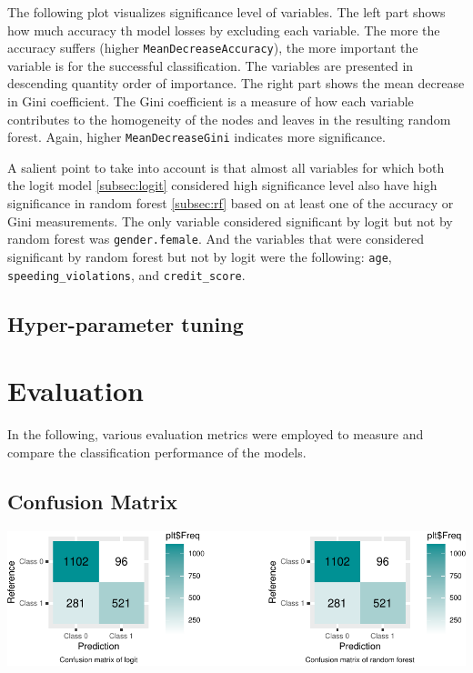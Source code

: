\documentclass{article}
\begin{document}
The following plot visualizes significance level of variables. The left
part shows how much accuracy th model losses by excluding each variable.
The more the accuracy suffers (higher \texttt{MeanDecreaseAccuracy}),
the more important the variable is for the successful classification.
The variables are presented in descending quantity order of importance.
The right part shows the mean decrease in Gini coefficient. The Gini
coefficient is a measure of how each variable contributes to the
homogeneity of the nodes and leaves in the resulting random forest.
Again, higher \texttt{MeanDecreaseGini} indicates more significance.

A salient point to take into account is that almost all variables for
which both the logit model \ref{subsec:logit} considered high
significance level also have high significance in random forest
\ref{subsec:rf} based on at least one of the accuracy or Gini
measurements. The only variable considered significant by logit but not
by random forest was \texttt{gender.female}. And the variables that were
considered significant by random forest but not by logit were the
following: \texttt{age}, \texttt{speeding\_violations}, and
\texttt{credit\_score}.

\hypertarget{hyper-parameter-tuning}{%
\subsection{Hyper-parameter tuning}\label{hyper-parameter-tuning}}

\hypertarget{evaluation}{%
\section{\texorpdfstring{Evaluation
\label{sec:evaluation}}{Evaluation }}\label{evaluation}}

In the following, various evaluation metrics were employed to measure
and compare the classification performance of the models.

\hypertarget{confusion-matrix}{%
\subsection{Confusion Matrix}\label{confusion-matrix}}

\includegraphics{report_files/figure-latex/unnamed-chunk-15-1.pdf}
\end{document}
